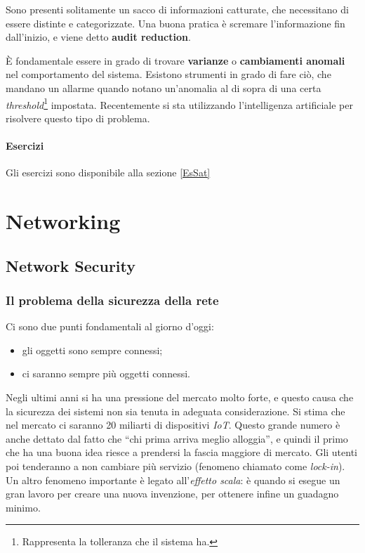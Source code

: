 Sono presenti solitamente un sacco di informazioni catturate, che necessitano
di essere distinte e categorizzate.
Una buona pratica è scremare l'informazione fin dall'inizio, e viene detto
\textbf{audit reduction}.

È fondamentale essere in grado di trovare \textbf{varianze} o \textbf{cambiamenti 
anomali} nel comportamento del sistema. Esistono strumenti in grado di fare
ciò, che mandano un allarme quando notano un'anomalia al di sopra di una certa
\textit{threshold}\footnote{Rappresenta la tolleranza che il sistema ha.}
impostata. Recentemente si sta utilizzando l'intelligenza artificiale per
risolvere questo tipo di problema.

\subsection{Esercizi}

Gli esercizi sono disponibile alla sezione \ref{EsSat}


\part{Networking}

\label{net}

\chapter{Network Security}

\section{Il problema della sicurezza della rete}

Ci sono due punti fondamentali al giorno d'oggi:

\begin{itemize}
\item gli oggetti sono sempre connessi;
\item ci saranno sempre più oggetti connessi.
\end{itemize}

Negli ultimi anni si ha una pressione del mercato molto forte, e questo causa
che la sicurezza dei sistemi non sia tenuta in adeguata considerazione. Si
stima che nel mercato ci saranno 20 miliarti di dispositivi \textit{IoT}.
Questo grande numero è anche dettato dal fatto che ``chi prima arriva meglio
alloggia'', e quindi il primo che ha una buona idea riesce a prendersi la
fascia maggiore di mercato. Gli utenti poi tenderanno a non cambiare più
servizio (fenomeno chiamato come \textit{lock-in}). Un altro fenomeno
importante è legato all'\textit{effetto scala}: è quando si esegue un gran
lavoro per creare una nuova invenzione, per ottenere infine un guadagno minimo.

